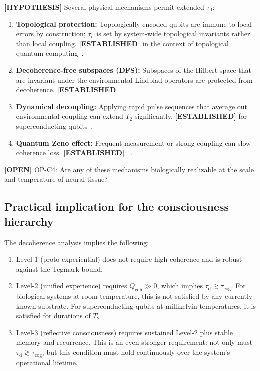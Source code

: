 \documentclass[12pt,letterpaper]{article}
\newcommand{\ESTABLISHED}[1]{\textcolor{green!50!black}{\textbf{[ESTABLISHED]}} #1}
\newcommand{\HYPOTHESIS}[1]{\textcolor{blue!70!black}{\textbf{[HYPOTHESIS]}} #1}
\newcommand{\OPEN}[1]{\textcolor{red!70!black}{\textbf{[OPEN]}} #1}
\newcommand{\Qcoh}{Q_{\mathrm{coh}}}
\newcommand{\taud}{\tau_{\mathrm{d}}}
\newcommand{\taucog}{\tau_{\mathrm{cog}}}
\begin{document}
\HYPOTHESIS{} Several physical mechanisms permit extended $\taud$:

\begin{enumerate}[label=(\roman*)]
  \item \textbf{Topological protection:} Topologically encoded qubits are
    immune to local errors by construction; $\taud$ is set by system-wide
    topological invariants rather than local coupling. \ESTABLISHED{} in
    the context of topological quantum computing~\cite{Nayak2008}.
  \item \textbf{Decoherence-free subspaces (DFS):} Subspaces of the Hilbert
    space that are invariant under the environmental Lindblad operators
    are protected from decoherence. \ESTABLISHED{}~\cite{Lidar1998}.
  \item \textbf{Dynamical decoupling:} Applying rapid pulse sequences that
    average out environmental coupling can extend $T_2$ significantly.
    \ESTABLISHED{} for superconducting qubits~\cite{Biercuk2011}.
  \item \textbf{Quantum Zeno effect:} Frequent measurement or strong
    coupling can slow coherence loss. \ESTABLISHED{}~\cite{Misra1977}.
\end{enumerate}

\OPEN{OP-C4: Are any of these mechanisms biologically realizable at the
scale and temperature of neural tissue?}

\subsection{Practical implication for the consciousness hierarchy}

The decoherence analysis implies the following:

\begin{enumerate}[label=(\roman*)]
  \item Level-1 (proto-experiential) does not require high coherence and is
    robust against the Tegmark bound.
  \item Level-2 (unified experience) requires $\Qcoh \gg 0$, which implies
    $\taud \gtrsim \taucog$. For biological systems at room temperature,
    this is not satisfied by any currently known substrate. For
    superconducting qubits at millikelvin temperatures, it is satisfied for
    durations of $T_2$.
  \item Level-3 (reflective consciousness) requires sustained Level-2 plus
    stable memory and recurrence. This is an even stronger requirement:
    not only must $\taud \gtrsim \taucog$, but this condition must hold
    continuously over the system's operational lifetime.
\end{enumerate}
\end{document}
